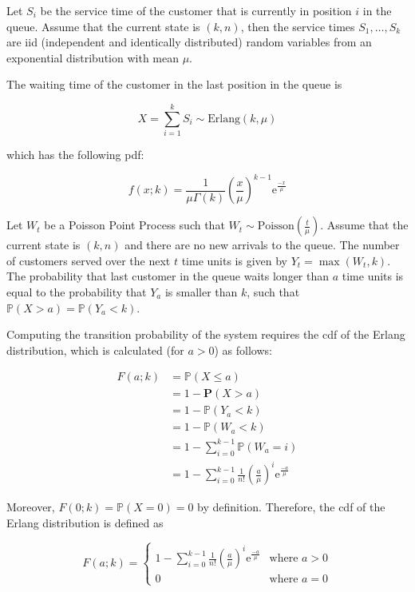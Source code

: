 Let $S_{i}$ be the service time of the customer that is currently in position $i$ in the queue. Assume that the current state is $(k, n)$, then the service times $S_{1}, \ldots, S_{k}$ are iid (independent and identically distributed) random variables from an exponential distribution with mean $\mu$.

The waiting time of the customer in the last position in the queue is

\begin{equation}
	X = \sum_{i = 1}^{k} S_{i} \sim \text{Erlang}(k, \mu)
\end{equation}

which has the following pdf:

\begin{equation}
	f (x; k) = \frac{1}{\mu \Gamma (k)} \left( \frac{x}{\mu} \right)^{k - 1} \mathrm{e}^{\frac{-x}{\mu}}
\end{equation}

Let $W_{t}$ be a Poisson Point Process such that $W_{t} \sim \text{Poisson} \left( \frac{t}{\mu} \right)$. Assume that the current state is $(k, n)$ and there are no new arrivals to the queue. The number of customers served over the next $t$ time units is given by $Y_{t} = \max (W_{t}, k)$. The probability that last customer in the queue waits longer than $a$ time units is equal to the probability that $Y_{a}$ is smaller than $k$, such that $\mathbb{P} (X > a) = \mathbb{P} (Y_{a} < k)$.

Computing the transition probability of the system requires the cdf of the Erlang distribution, which is calculated (for $a > 0$) as follows:

\begin{align*}
	F (a; k) & = \mathbb{P} (X \leq a) \\
	& = 1 - \mathbf{P} (X > a) \\
	& = 1 - \mathbb{P} (Y_{a} < k) \\
	& = 1 - \mathbb{P} (W_{a} < k) \\
	& = 1 - \sum_{i = 0}^{k - 1} \mathbb{P} (W_{a} = i) \\
	& = 1 - \sum_{i = 0}^{k - 1} \frac{1}{n!} \left( \frac{a}{\mu} \right)^{i} \mathrm{e}^{\frac{-a}{\mu}}
\end{align*}

Moreover, $F (0; k) = \mathbb{P} (X = 0) = 0$ by definition. Therefore, the cdf of the Erlang distribution is defined as

\begin{equation}
	F (a; k) = \begin{cases} 1 - \sum_{i = 0}^{k - 1} \frac{1}{n!} \left( \frac{a}{\mu} \right)^{i} \mathrm{e}^{\frac{-a}{\mu}} & \text{where $a > 0$} \\ 0 & \text{where $a = 0$} \end{cases}
\end{equation}

